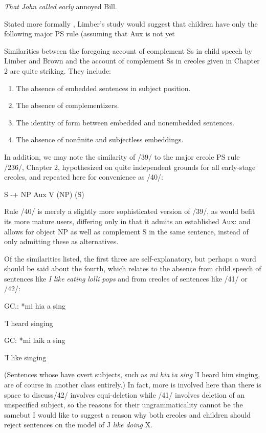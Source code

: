 \ea\label{ex:38}
 \textit{That} \textit{John} \textit{called} \textit{early} annoyed Bill.
\glt
\z

Stated more formally , Limber's study would suggest that children have only the following major PS rule (assuming that Aux is not yet


Similarities between the foregoing account of complement Ss in child speech by Limber and Brown and the account of complement Ss in creoles given in Chapter 2 are quite striking. They include:


\begin{enumerate}
\item The absence of embedded sentences in subject position.
\item The absence of complementizers.
\item  The identity of form between embedded and nonembedded sentences.
\item The absence of nonfinite and subjectless embeddings.
\end{enumerate}


In addition, we may note the similarity of /39/ to the major creole PS rule /236/, Chapter 2, hypothesized on quite independent grounds for all early-stage creoles, and repeated here for convenience as /40/:

\ea\label{ex:40}
 S {}-+ NP Aux V (NP) (S)
\glt
\z

Rule /40/ is merely a slightly more sophisticated version of /39/, as would befit its more mature users, differing only in that it admits an established Aux: and allows for object NP as well as complement S in the same sentence, instead of only admitting these as alternatives.

Of the similarities listed, the first three are self-explanatory, but perhaps a word should be said about the fourth, which relates to the absence from child speech of sentences like \textit{I} \textit{like} \textit{eating} \textit{lolli\-} \textit{pops} and from creoles of sentences like /41/ or /42/:

\ea\label{ex:41}
 GC.: *mi hia a sing
\glt
\z

'I heard singing


\ea\label{ex:42}
 GC: *mi laik a sing
\glt
\z

'I like singing

(Sentences whose  have overt subjects, such as \textit{mi} \textit{hia} i\textit{a} \textit{si}\textit{n}\textit{g} 'I heard him singing, are of course in another class entirely.) In fact, more is involved here than there is space to discuss/42/ involves equi-deletion while /41/ involves deletion of an unspecified subject, so the reasons for their ungrammaticality cannot be the samebut I would like to suggest a reason why both creoles and children should reject sentences on the model of J \textit{like} \textit{doing} X.

